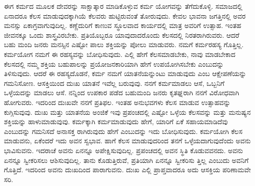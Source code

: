 ಈಗ ಕರ್ಮದ ಮೂಲಕ ದೇವರನ್ನು ಸಾಕ್ಷಾತ್ಕಾರ ಮಾಡಿಕೊಳ್ಳುವ ಕರ್ಮ ಯೋಗವನ್ನು ತೆಗೆದುಕೊಳ್ಳಿ. ಸಮಾಜದಲ್ಲಿ ಏನಾದರೂ ಕೆಲಸ ಮಾಡುವುದಕ್ಕಾಗಿಯೆ ಕೆಲವರು ಹುಟ್ಟಿರುವಂತೆ ತೋರುವುದು. ಕೇವಲ ಭಾವನಾ ಜಗತ್ತಿನಲ್ಲಿ ಅವರ ಮನಸ್ಸು ಏಕಾಗ್ರವಾಗುವುದಿಲ್ಲ. ಕಣ್ಣೆದುರಿಗೆ ಕಾಣುವ ಸ್ಥೂಲವಾದ ಕಾರ್ಯದಲ್ಲಿ ಮಾತ್ರ ಅವರಿಗೆ ಉತ್ಸಾಹ. ಇಂತಹ ಜೀವನಕ್ಕೂ ಒಂದು ಶಾಸ್ತ್ರವಿರಬೇಕು. ಪ್ರತಿಯೊಬ್ಬರೂ ಯಾವುದಾದರೊಂದು ಕೆಲಸದಲ್ಲಿ ನಿರತರಾಗಿರುವರು. ಆದರೆ ಬಹು ಮಂದಿ ಜನರು ಮನಸ್ಸಿನ ಎಷ್ಟೋ ಪಾಲು ಶಕ್ತಿಯನ್ನು ಪೋಲು ಮಾಡುವರು. ನಮಗೆ ಕರ್ಮರಹಸ್ಯ ಗೊತ್ತಿಲ್ಲ. ಕರ್ಮಯೋಗ ನಮಗೆ ಈ ರಹಸ್ಯವನ್ನು ಬೋಧಿಸುವುದು. ಎಲ್ಲಿ ಹೇಗೆ ಕೆಲಸಮಾಡಬೇಕು, ನಾವು ಮಾಡಬೇಕಾದ ಕೆಲಸದಲ್ಲಿ ನಮ್ಮ ಶಕ್ತಿಯ ಬಹುಪಾಲನ್ನು ಪ್ರಯೋಜನಕಾರಿಯಾಗಿ ಹೇಗೆ ಉಪಯೋಗಿಸಬೇಕು ಎಂಬುದನ್ನು ತಿಳಿಸುವುದು. ಆದರೆ ಈ ರಹಸ್ಯದೊಡನೆ, ಕರ್ಮ ನಮಗೆ ಯಾತನೆಯನ್ನುಂಟು ಮಾಡುವುದು ಎಂಬ ಆಕ್ಷೇಪಣೆಯನ್ನು ಗಮನಿಸೋಣ. ಆಸಕ್ತಿಯಿಂದ ದುಃಖ ಯಾತನೆ ಇವೆಲ್ಲ ಬರುವುವು. ನನಗೆ ಕರ್ಮಮಾಡಲು ಆಸೆ, ಒಬ್ಬನಿಗೆ ಒಳ್ಳೆಯದನ್ನು ಮಾಡಲು ಆಸೆ. ನನ್ನಿಂದ ಉಪಕಾರ ಪಡೆದ ಬಹುಮಂದಿ ಜನರು ಕೃತಘ್ನರಾಗಿ ನನಗೆ ವಿರೋಧವಾಗಿ ಹೋಗುವರು. ಇದರಿಂದ ದುಃಖವೇ ನನಗೆ ಪ್ರತಿಫಲ. ಇಂತಹ ಅನುಭವಗಳು ಕೆಲಸ ಮಾಡುವ ಉತ್ಸಾಹವನ್ನು ಕುಗ್ಗಿಸುವುವು. ದುಃಖ ಮತ್ತು ಯಾತನೆಯ ಅಂಜಿಕೆ ಇವು ಪ್ರಪಂಚದಲ್ಲಿ ಎಷ್ಟೋ ಒಳ್ಳೆಯ ಕೆಲಸವನ್ನು ಮತ್ತು ಮನುಷ್ಯನ ಶಕ್ತಿಯನ್ನು ಹಾಳುಮಾಡುವುವು. ಕರ್ಮಕ್ಕಾಗಿ ಕರ್ಮಮಾಡುವುದು ಹೇಗೆ, ಯಾರಿಗೆ ಏಕೆ ಸಹಾಯಮಾಡಿದೆವು ಎಂಬುದನ್ನು ಗಮನಿಸದೆ ಅನಾಸಕ್ತ ರಾಗಿರುವುದು ಹೇಗೆ ಎಂಬುದನ್ನು ಇದು ಬೋಧಿಸುವುದು. ಕರ್ಮಯೋಗಿ ಕೆಲಸ ಮಾಡುವನು, ಏಕೆಂದರೆ ಇದು ಅವನ ಸ್ವಭಾವ. ಹಾಗೆ ಕೆಲಸ ಮಾಡುವುದರಿಂದ ತನಗೆ ಒಳ್ಳೆಯದಾಗುವುದೆಂದು ಅವನು ಭಾವಿಸುವನು. ಇದರಾಚೆ ಅವನು ಏನನ್ನೂ ಅಪೇಕ್ಷಿಸುವುದಿಲ್ಲ. ಪ್ರಪಂಚದಲ್ಲಿ ಅವನ ಸ್ಥಿತಿ ಕೊಡುವವನದು. ಅವನು ಏನನ್ನೂ ಸ್ವೀಕರಿಸಲು ಆಶಿಸುವುದಿಲ್ಲ. ತಾನು ಕೊಡುತ್ತಿರುವೆ, ಪ್ರತಿಯಾಗಿ ಏನನ್ನೂ ಸ್ವೀಕರಿಸು ತ್ತಿಲ್ಲ ಎಂಬುದು ಅವನಿಗೆ ಗೊತ್ತಿದೆ. ಇದರಿಂದ ಅವನು ದುಃಖದಿಂದ ಪಾರಾಗುವನು. ದುಃಖ ಎಲ್ಲಿ ಪ್ರಾಪ್ತವಾದರೂ ಅದು ಆಸಕ್ತಿಯ ಪರಿಣಾಮವೇ ಸರಿ.

